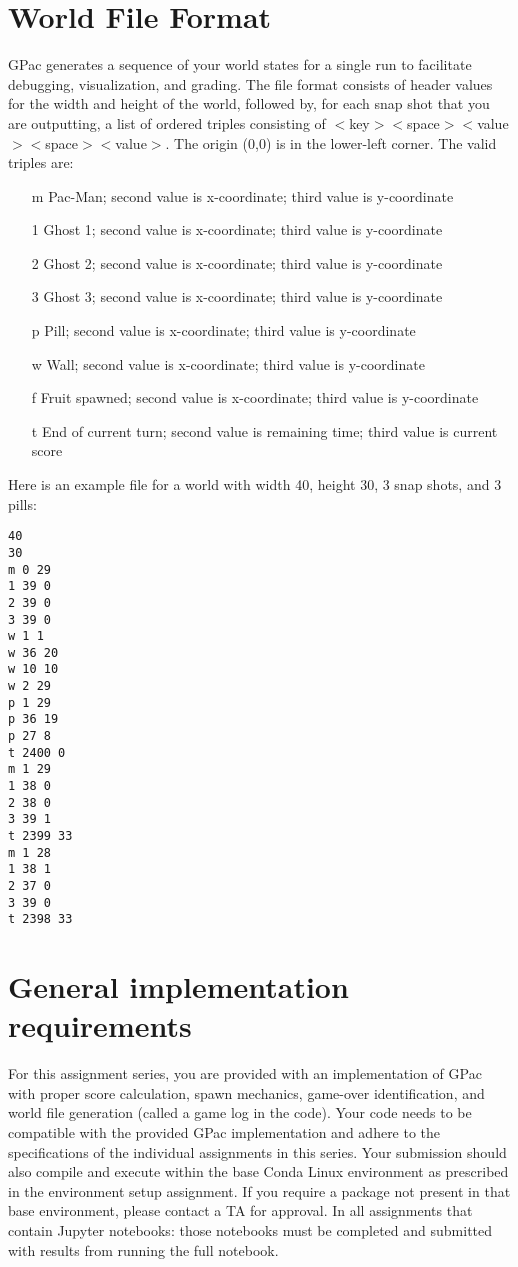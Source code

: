 \documentclass{article}
\begin{document}
\section*{World File Format}
GPac generates a sequence of your world states for a single run to facilitate debugging, visualization, and grading. The file format consists of header values for the width and height of the world, followed by, for each snap shot that you are outputting, a list of ordered triples consisting of $<$key$><$space$><$value$><$space$><$value$>$. The origin (0,0) is in the lower-left corner. The valid triples are:
\begin{itemize}
\item[m] Pac-Man; second value is x-coordinate; third value is y-coordinate
\item[1] Ghost 1; second value is x-coordinate; third value is y-coordinate
\item[2] Ghost 2; second value is x-coordinate; third value is y-coordinate
\item[3] Ghost 3; second value is x-coordinate; third value is y-coordinate
\item[p] Pill; second value is x-coordinate; third value is y-coordinate
\item[w] Wall; second value is x-coordinate; third value is y-coordinate
\item[f] Fruit spawned; second value is x-coordinate; third value is y-coordinate
\item[t] End of current turn; second value is remaining time; third value is current score
\end{itemize}
\noindent Here is an example file for a world with width 40, height 30, 3 snap shots, and 3 pills:
\begin{verbatim}
40
30
m 0 29
1 39 0
2 39 0
3 39 0
w 1 1
w 36 20
w 10 10
w 2 29
p 1 29
p 36 19
p 27 8
t 2400 0
m 1 29
1 38 0
2 38 0
3 39 1
t 2399 33
m 1 28
1 38 1
2 37 0
3 39 0
t 2398 33
\end{verbatim}

\section*{General implementation requirements}
For this assignment series, you are provided with an implementation of GPac with proper score calculation, spawn mechanics, game-over identification, and world file generation (called a game log in the code). Your code needs to be compatible with the provided GPac implementation and adhere to the specifications of the individual assignments in this series. Your submission should also compile and execute within the base Conda Linux environment as prescribed in the environment setup assignment. If you require a package not present in that base environment, please contact a TA for approval. In all assignments that contain Jupyter notebooks: those notebooks must be completed and submitted with results from running the full notebook.
\end{document}
